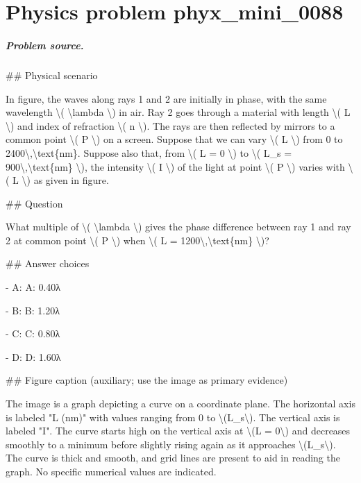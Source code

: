 
\chapter{Physics problem phyx\_mini\_0088}
\label{ch:PhyXMiniProblems_problem_phyx_mini_0088}

\paragraph{Problem source.}
\#\# Physical scenario

In figure, the waves along rays 1 and 2 are initially in phase, with the same wavelength \textbackslash{}( \textbackslash{}lambda \textbackslash{}) in air. Ray 2 goes through a material with length \textbackslash{}( L \textbackslash{}) and index of refraction \textbackslash{}( n \textbackslash{}). The rays are then reflected by mirrors to a common point \textbackslash{}( P \textbackslash{}) on a screen. Suppose that we can vary \textbackslash{}( L \textbackslash{}) from 0 to 2400\textbackslash{},\textbackslash{}text\{nm\}. Suppose also that, from \textbackslash{}( L = 0 \textbackslash{}) to \textbackslash{}( L\_s = 900\textbackslash{},\textbackslash{}text\{nm\} \textbackslash{}), the intensity \textbackslash{}( I \textbackslash{}) of the light at point \textbackslash{}( P \textbackslash{}) varies with \textbackslash{}( L \textbackslash{}) as given in figure.

\#\# Question

What multiple of \textbackslash{}( \textbackslash{}lambda \textbackslash{}) gives the phase difference between ray 1 and ray 2 at common point \textbackslash{}( P \textbackslash{}) when \textbackslash{}( L = 1200\textbackslash{},\textbackslash{}text\{nm\} \textbackslash{})?

\#\# Answer choices

- A: A: 0.40λ

- B: B: 1.20λ

- C: C: 0.80λ

- D: D: 1.60λ

\#\# Figure caption (auxiliary; use the image as primary evidence)

The image is a graph depicting a curve on a coordinate plane. The horizontal axis is labeled "L (nm)" with values ranging from 0 to \textbackslash{}(L\_s\textbackslash{}). The vertical axis is labeled "I". The curve starts high on the vertical axis at \textbackslash{}(L = 0\textbackslash{}) and decreases smoothly to a minimum before slightly rising again as it approaches \textbackslash{}(L\_s\textbackslash{}). The curve is thick and smooth, and grid lines are present to aid in reading the graph. No specific numerical values are indicated.

